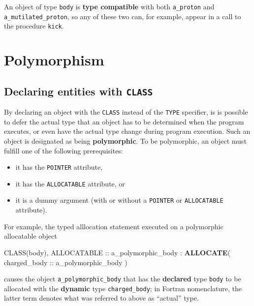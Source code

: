 \documentclass[
]{article}
\newenvironment{Shaded}{}{}
\newcommand{\DataTypeTok}[1]{\textcolor[rgb]{0.56,0.13,0.00}{#1}}
\newcommand{\KeywordTok}[1]{\textcolor[rgb]{0.00,0.44,0.13}{\textbf{#1}}}
\newcommand{\NormalTok}[1]{#1}
\providecommand{\tightlist}{%
  \setlength{\itemsep}{0pt}\setlength{\parskip}{0pt}}
\begin{document}
An object of type \texttt{body} is \textbf{type compatible} with both
\texttt{a\_proton} and \texttt{a\_mutilated\_proton}, so any of these
two can, for example, appear in a call to the procedure \texttt{kick}.

\section{Polymorphism}\label{polymorphism}

\subsection{\texorpdfstring{Declaring entities with
\texttt{CLASS}}{Declaring entities with CLASS}}\label{declaring-entities-with-class}

By declaring an object with the \texttt{CLASS} instead of the
\texttt{TYPE} specifier, is is possible to defer the actual type that an
object has to be determined when the program executes, or even have the
actual type change during program execution. Such an object is
designated as being \textbf{polymorphic}. To be polymorphic, an object
must fulfill one of the following prerequisites:

\begin{itemize}
\tightlist
\item
  it has the \texttt{POINTER} attribute,
\item
  it has the \texttt{ALLOCATABLE} attribute, or
\item
  it is a dummy argument (with or without a \texttt{POINTER} or
  \texttt{ALLOCATABLE} attribute).
\end{itemize}

For example, the typed alllocation statement executed on a polymorphic
allocatable object

\begin{Shaded}
\begin{Highlighting}[]
\DataTypeTok{CLASS(body)}\NormalTok{, }\DataTypeTok{ALLOCATABLE} \DataTypeTok{::}\NormalTok{ a\_polymorphic\_body}
\NormalTok{:}
\KeywordTok{ALLOCATE}\NormalTok{( charged\_body }\DataTypeTok{::}\NormalTok{ a\_polymorphic\_body )}
\end{Highlighting}
\end{Shaded}

causes the object \texttt{a\_polymorphic\_body} that has the
\textbf{declared} type \texttt{body} to be allocated with the
\textbf{dynamic} type \texttt{charged\_body}; in Fortran nomenclature,
the latter term denotes what was referred to above as ``actual'' type.
\end{document}
